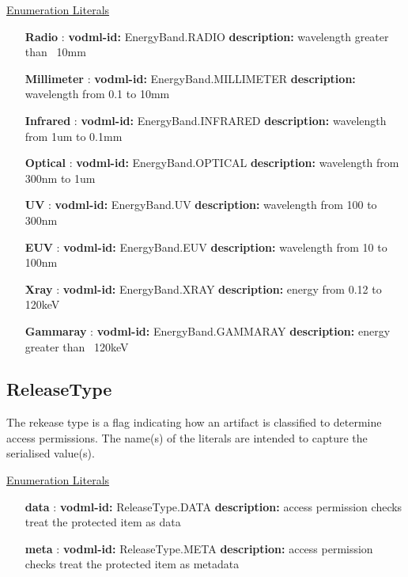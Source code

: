   \noindent \underline{Enumeration Literals}
  \vspace{-\parsep}
  \small
  \begin{itemize}
  
    \item[\textbf{Radio}]: \textbf{vodml-id:} EnergyBand.RADIO \newline
          \textbf{description:} wavelength greater than ~10mm
    \item[\textbf{Millimeter}]: \textbf{vodml-id:} EnergyBand.MILLIMETER \newline
          \textbf{description:} wavelength from 0.1 to 10mm
    \item[\textbf{Infrared}]: \textbf{vodml-id:} EnergyBand.INFRARED \newline
          \textbf{description:} wavelength from 1um to 0.1mm
    \item[\textbf{Optical}]: \textbf{vodml-id:} EnergyBand.OPTICAL \newline
          \textbf{description:} wavelength from 300nm to 1um
    \item[\textbf{UV}]: \textbf{vodml-id:} EnergyBand.UV \newline
          \textbf{description:} wavelength from 100 to 300nm
    \item[\textbf{EUV}]: \textbf{vodml-id:} EnergyBand.EUV \newline
          \textbf{description:} wavelength from 10 to 100nm
    \item[\textbf{Xray}]: \textbf{vodml-id:} EnergyBand.XRAY \newline
          \textbf{description:} energy from 0.12 to 120keV
    \item[\textbf{Gammaray}]: \textbf{vodml-id:} EnergyBand.GAMMARAY \newline
          \textbf{description:} energy greater than ~120keV
  \end{itemize}
  \normalsize


  \subsection{ReleaseType}
  \label{sect:ReleaseType}

  The rekease type is a flag indicating how an artifact is classified to determine access permissions. The name(s) of the literals are intended to capture the serialised value(s).

  \noindent \underline{Enumeration Literals}
  \vspace{-\parsep}
  \small
  \begin{itemize}
  
    \item[\textbf{data}]: \textbf{vodml-id:} ReleaseType.DATA \newline
          \textbf{description:} access permission checks treat the protected item as data
    \item[\textbf{meta}]: \textbf{vodml-id:} ReleaseType.META \newline
          \textbf{description:} access permission checks treat the protected item as metadata
  \end{itemize}
  \normalsize


